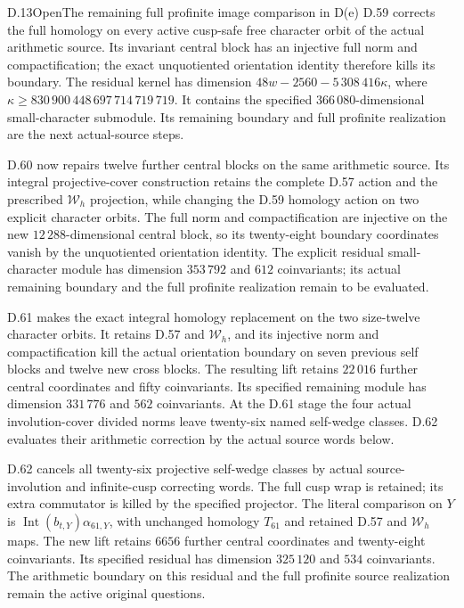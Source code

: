 \begin{statement}{D.13}{Open}{The remaining full profinite image comparison in D(e)}
D.59 corrects the full homology on every active cusp-safe free
character orbit of the actual arithmetic source. Its invariant
central block has an injective full norm and compactification;
the exact unquotiented orientation identity therefore kills its
boundary. The residual kernel has dimension
$48w-2560-5\,308\,416\kappa$, where
$\kappa\geq830\,900\,448\,697\,714\,719\,719$.
It contains the specified $366\,080$-dimensional small-character
submodule. Its remaining boundary and full profinite realization
are the next actual-source steps.

D.60 now repairs twelve further central blocks on the same
arithmetic source. Its integral projective-cover construction
retains the complete D.57 action and the prescribed $\mathcal W_h$
projection, while changing the D.59 homology action on two
explicit character orbits. The full norm and compactification
are injective on the new $12\,288$-dimensional central block,
so its twenty-eight boundary coordinates vanish by the
unquotiented orientation identity. The explicit residual
small-character module has dimension $353\,792$ and
$612$ coinvariants; its actual remaining boundary and the
full profinite realization remain to be evaluated.

D.61 makes the exact integral homology replacement on the two
size-twelve character orbits. It retains D.57 and $\mathcal W_h$,
and its injective norm and compactification kill the actual
orientation boundary on seven previous self blocks and twelve
new cross blocks. The resulting lift retains $22\,016$ further
central coordinates and fifty coinvariants. Its specified
remaining module has dimension $331\,776$ and $562$ coinvariants.
At the D.61 stage the four actual involution-cover divided norms
leave twenty-six named self-wedge classes. D.62 evaluates their
arithmetic correction by the actual source words below.

D.62 cancels all twenty-six projective self-wedge classes by
actual source-involution and infinite-cusp correcting words.
The full cusp wrap is retained; its extra commutator is killed
by the specified projector. The literal comparison on $Y$ is
$\operatorname{Int}(b_{t,Y})\alpha_{61,Y}$, with unchanged
homology $T_{61}$ and retained D.57 and $\mathcal W_h$ maps.
The new lift retains $6656$ further central coordinates and
twenty-eight coinvariants. Its specified residual has dimension
$325\,120$ and $534$ coinvariants. The arithmetic boundary on
this residual and the full profinite source realization remain
the active original questions.


\end{statement}
